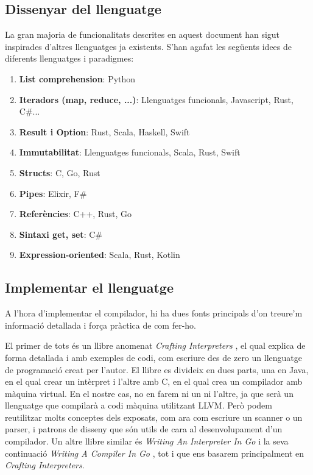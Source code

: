 ﻿\documentclass{article}
\begin{document}
\subsection{Dissenyar del llenguatge}
La gran majoria de funcionalitats descrites en aquest document han sigut
inspirades d'altres llenguatges ja existents. S'han agafat les següents idees de
diferents llenguatges i paradigmes:

\begin{enumerate}
\item \textbf{List comprehension}: Python
\item \textbf{Iteradors (map, reduce, ...)}: Llenguatges funcionals, Javascript, Rust, C\#...
\item \textbf{Result i Option}: Rust, Scala, Haskell, Swift
\item \textbf{Immutabilitat}: Llenguatges funcionals, Scala, Rust, Swift
\item \textbf{Structs}: C, Go, Rust
\item \textbf{Pipes}: Elixir, F\#
\item \textbf{Referències}: C++, Rust, Go
\item \textbf{Sintaxi get, set}: C\#
\item \textbf{Expression-oriented}: Scala, Rust, Kotlin
\end{enumerate}

\subsection{Implementar el llenguatge}
A l'hora d'implementar el compilador, hi ha dues fonts principals d'on treure'm
informació detallada i força pràctica de com fer-ho.

El primer de tots és un llibre anomenat \textit{Crafting Interpreters}
\cite{crafting-interpreters}, el qual explica de forma detallada i amb exemples
de codi, com escriure des de zero un llenguatge de programació creat per l'autor.
El llibre es divideix en dues parts, una en Java, en el qual crear un intèrpret
i l'altre amb C, en el qual crea un compilador amb màquina virtual. En el nostre cas,
no en farem ni un ni l'altre, ja que serà un llenguatge que compilarà a codi
màquina utilitzant LLVM. Però podem reutilitzar molts conceptes dels exposats,
com ara com escriure un scanner o un parser, i patrons de disseny que són
utils de cara al desenvolupament d'un compilador. Un altre llibre similar és
\textit{Writing An Interpreter In Go} \cite{interpreterbook} i la seva
continuació \textit{Writing A Compiler In Go} \cite{compilerbook}, tot i que
ens basarem principalment en \textit{Crafting Interpreters}.
\end{document}
